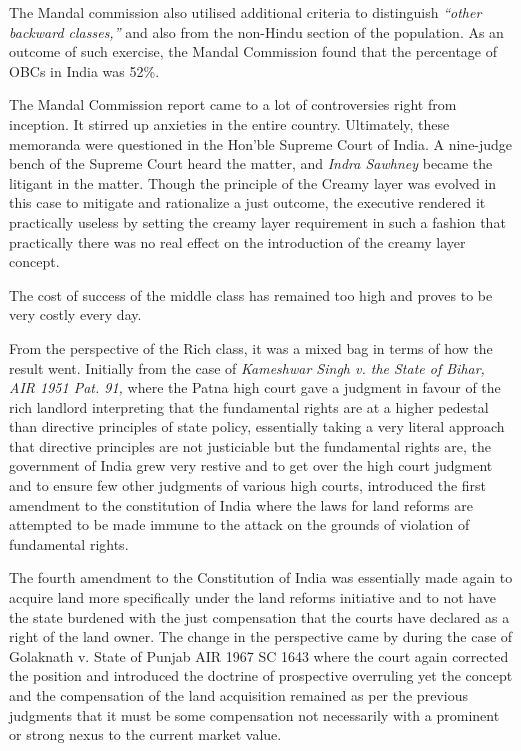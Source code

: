 \begin{multicols}{2}
\vspace{-.1cm}

\noi
The Mandal commission also utilised additional criteria to distinguish \textit{“other backward classes,”} and also from the non-Hindu section of the population. As an outcome of such exercise, the Mandal Commission found that the percentage of OBCs in India was 52\%.

\vspace{-.1cm}

\noi
The Mandal Commission report came to a lot of controversies right from inception. It stirred up anxieties in the entire country. Ultimately, these memoranda were questioned in the Hon’ble Supreme Court of India. A nine-judge bench of the Supreme Court heard the matter, and \textit{Indra Sawhney} became the litigant in the matter. Though the principle of the Creamy layer was evolved in this case to mitigate and rationalize a just outcome, the executive rendered it practically useless by setting the creamy layer requirement in such a fashion that practically there was no real effect on the introduction of the creamy layer concept.

\noi
The cost of success of the middle class has remained too high and proves to be very costly every day.


\noi
From the perspective of the Rich class, it was a mixed bag in terms of how the result went. Initially from the case of \textit{Kameshwar Singh v. the State of Bihar, AIR 1951 Pat. 91,} where the Patna high court gave a judgment in favour of the rich landlord interpreting that the fundamental rights are at a higher pedestal than directive principles of state policy, essentially taking a very literal approach that directive principles are not justiciable but the fundamental rights are, the government of India grew very restive and to get over the high court judgment and to ensure few other judgments of various high courts, introduced the first amendment to the constitution of India where the laws for land reforms are attempted to be made immune to the attack on the grounds of violation of fundamental rights.

\noi
The fourth amendment to the Constitution of India was essentially made again to acquire land more specifically under the land reforms initiative and to not have the state burdened with the just compensation that the courts have declared as a right of the land owner. The change in the perspective came by during the case of Golaknath v. State of Punjab AIR 1967 SC 1643 where the court again corrected the position and introduced the doctrine of prospective overruling yet the concept and the compensation of the land acquisition remained as per the previous judgments that it must be some compensation not necessarily with a prominent or strong nexus to the current market value.


\end{multicols}

